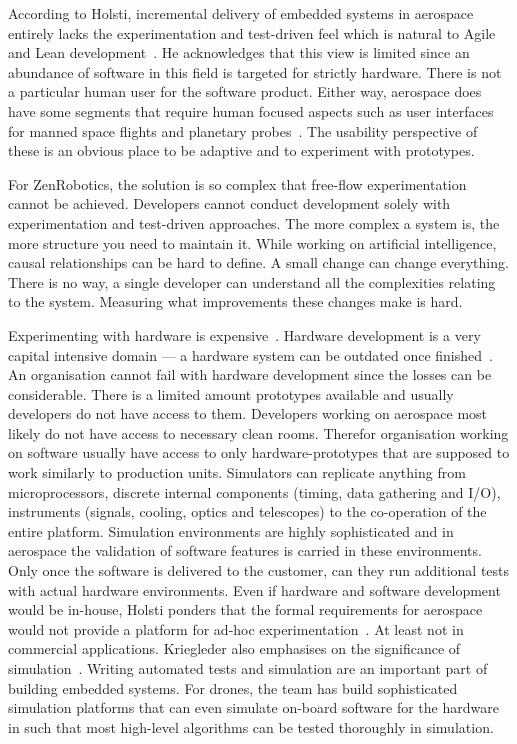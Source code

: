 \documentclass[english]{tktltiki2}
\begin{document}
According to Holsti, incremental delivery of embedded systems in aerospace entirely lacks the experimentation and test-driven feel which is natural to Agile and Lean development~\cite{Hol15b}. He acknowledges that this view is limited since an abundance of software in this field is targeted for strictly hardware. There is not a particular human user for the software product. Either way, aerospace does have some segments that require human focused aspects such as user interfaces for manned space flights and planetary probes~\cite{Hol15b}. The usability perspective of these is an obvious place to be adaptive and to experiment with prototypes.

For ZenRobotics, the solution is so complex that free-flow experimentation cannot be achieved. Developers cannot conduct development solely with experimentation and test-driven approaches. The more complex a system is, the more structure you need to maintain it. While working on artificial intelligence, causal relationships can be hard to define. A small change can change everything. There is no way, a single developer can understand all the complexities relating to the system. Measuring what improvements these changes make is hard.

Experimenting with hardware is expensive~\cite{Hol15a, Hol15b}. Hardware development is a very capital intensive domain — a hardware system can be outdated once finished~\cite{Hol15a}. An organisation cannot fail with hardware development since the losses can be considerable. There is a limited amount prototypes available and usually developers do not have access to them. Developers working on aerospace most likely do not have access to necessary clean rooms. Therefor organisation working on software usually have access to only hardware-prototypes that are supposed to work similarly to production units. Simulators can replicate anything from microprocessors, discrete internal components (timing, data gathering and I/O), instruments (signals, cooling, optics and telescopes) to the co-operation of the entire platform. Simulation environments are highly sophisticated and in aerospace the validation of software features is carried in these environments. Only once the software is delivered to the customer, can they run additional tests with actual hardware environments. Even if hardware and software development would be in-house, Holsti ponders that the formal requirements for aerospace would not provide a platform for ad-hoc experimentation~\cite{Hol15b}. At least not in commercial applications. Kriegleder also emphasises on the significance of simulation~\cite{Kri15}. Writing automated tests and simulation are an important part of building embedded systems. For drones, the team has build sophisticated simulation platforms that can even simulate on-board software for the hardware in such that most high-level algorithms can be tested thoroughly in simulation.
\end{document}
